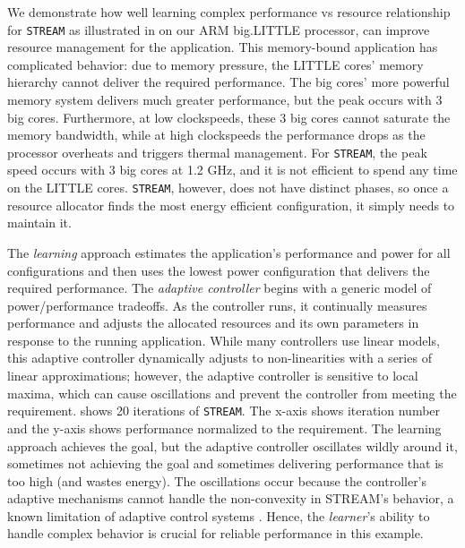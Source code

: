 We demonstrate how well learning complex performance vs resource relationship for \texttt{STREAM} as illustrated in  on our ARM big.LITTLE
processor, can improve resource management for the application.  This memory-bound application has
complicated behavior: due to memory pressure, the LITTLE cores' memory
hierarchy cannot deliver the required performance.  The big cores'
more powerful memory system delivers much greater performance, but the
peak occurs with 3 big cores.  Furthermore, at low clockspeeds, these
3 big cores cannot saturate the memory bandwidth, while at high
clockspeeds the performance drops as the processor overheats and
triggers thermal management.  For \texttt{STREAM}, the peak speed
occurs with 3 big cores at 1.2 GHz, and it is not efficient to spend
any time on the LITTLE cores.  \texttt{STREAM}, however, does not have
distinct phases, so once a resource allocator finds the most energy
efficient configuration, it simply needs to maintain it.  

The \emph{learning}
approach estimates the application's performance and power for all
configurations and then uses the lowest power configuration that
delivers the required performance.  The \emph{adaptive controller}
begins with a generic model of power/performance tradeoffs.  As the
controller runs, it continually measures performance and adjusts the
allocated resources and its own parameters in response to
the running application.  While many controllers use linear models,
this adaptive controller dynamically adjusts to non-linearities with a
series of linear approximations; however, the adaptive controller is
sensitive to local maxima, which can cause oscillations and prevent
the controller from meeting the requirement.  shows 20 iterations of \texttt{STREAM}.  The
x-axis shows iteration number and the y-axis shows performance
normalized to the requirement.  The learning approach achieves the
goal, but the adaptive controller oscillates wildly around it,
sometimes not achieving the goal and sometimes delivering performance
that is too high (and wastes energy).  The oscillations occur because
the controller's adaptive mechanisms cannot handle the non-convexity
in STREAM's behavior, a known limitation of adaptive control systems
\cite{ControlWare,POET,ICSE2014}.  Hence, the \emph{learner}'s ability
to handle complex behavior is crucial for reliable performance in this
example.

